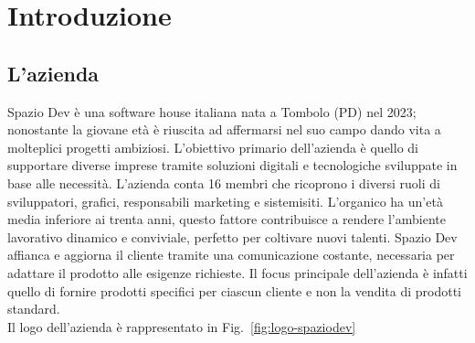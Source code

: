 \chapter{Introduzione}
\label{cap:introduzione}

%
%
%
%

\section{L'azienda}
Spazio Dev è una software house italiana nata a Tombolo (PD) nel 2023; nonostante la giovane età è riuscita ad affermarsi nel suo campo dando vita a molteplici progetti ambiziosi. L'obiettivo primario dell'azienda è quello di supportare diverse imprese tramite soluzioni digitali e tecnologiche sviluppate in base alle necessità.
L'azienda conta 16 membri che ricoprono i diversi ruoli di sviluppatori, grafici, responsabili marketing e sistemisiti. L'organico ha un'età media inferiore ai trenta anni, questo fattore contribuisce a rendere l'ambiente lavorativo dinamico e conviviale, perfetto per coltivare nuovi talenti.
Spazio Dev affianca e aggiorna il cliente tramite una comunicazione costante, necessaria per adattare il prodotto alle esigenze richieste. Il focus principale dell'azienda è infatti quello di fornire prodotti specifici per ciascun cliente e non la vendita di prodotti standard.\\
Il logo dell'azienda è rappresentato in Fig.~\ref{fig:logo-spaziodev}

